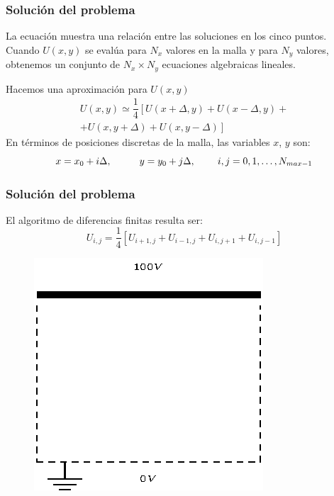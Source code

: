 \documentclass[12pt]{beamer}
\begin{document}
\begin{frame}
\frametitle{Solución del problema}
La ecuación muestra una relación entre las soluciones en los cinco puntos.
\\
\bigskip
Cuando $U(x,y)$ se evalúa para $N_{x}$ valores en la malla y para $N_{y}$ valores, obtenemos un conjunto de $N_{x} \times N_{y}$ ecuaciones algebraicas lineales.
\end{frame}
\begin{frame}
Hacemos una aproximación para $U(x,y)$
\begin{eqnarray*}
U(x,y) \simeq	\dfrac{1}{4} \left[ U(x+\Delta ,y) + U(x-\Delta,y) + \right. \\
\left. + U(x,y+\Delta) + U(x,y-\Delta) \right]
\end{eqnarray*}
En términos de posiciones discretas de la malla, las variables $x$, $y$ son:
\[ x = x_{0} + i \Delta, \hspace{1cm} y = y_{0}+ j \Delta, \hspace{0.8cm} i,j = 0,1,\ldots,N_{max-1} \]
\end{frame}
\begin{frame}
\frametitle{Solución del problema}
El algoritmo de diferencias finitas resulta ser:
\[ U_{i,j} = \dfrac{1}{4} [U_{i+1,j} + U_{i-1,j} + U_{i,j+1} + U_{i,j-1}] \]
\begin{figure}
	\centering
	\includegraphics[scale=0.6]{Imagenes/mallaSolucionEDP_04.eps}
\end{figure}
\end{frame}
\end{document}
